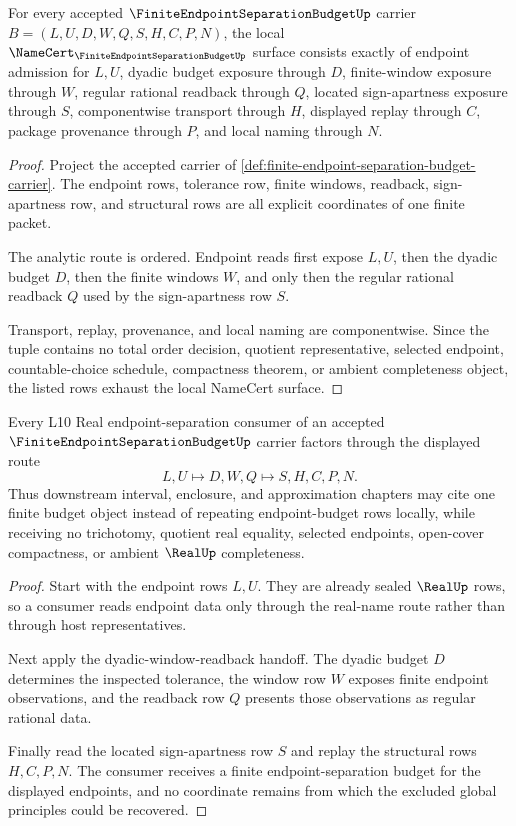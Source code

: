 \begin{theorem}
\label{thm:finite-endpoint-separation-budget-namecert-obligations}
For every accepted $\FiniteEndpointSeparationBudgetUp$ carrier $B=(L,U,D,W,Q,S,H,C,P,N)$, the local $\NameCert_{\FiniteEndpointSeparationBudgetUp}$ surface consists exactly of endpoint admission for $L,U$, dyadic budget exposure through $D$, finite-window exposure through $W$, regular rational readback through $Q$, located sign-apartness exposure through $S$, componentwise transport through $H$, displayed replay through $C$, package provenance through $P$, and local naming through $N$.
\end{theorem}
\begin{proof}
Project the accepted carrier of \autoref{def:finite-endpoint-separation-budget-carrier}. The endpoint rows, tolerance row, finite windows, readback, sign-apartness row, and structural rows are all explicit coordinates of one finite packet.

The analytic route is ordered. Endpoint reads first expose $L,U$, then the dyadic budget $D$, then the finite windows $W$, and only then the regular rational readback $Q$ used by the sign-apartness row $S$.

Transport, replay, provenance, and local naming are componentwise. Since the tuple contains no total order decision, quotient representative, selected endpoint, countable-choice schedule, compactness theorem, or ambient completeness object, the listed rows exhaust the local NameCert surface.
\end{proof}

\begin{theorem}
\label{thm:finite-endpoint-separation-budget-real-route}
Every L10 Real endpoint-separation consumer of an accepted $\FiniteEndpointSeparationBudgetUp$ carrier factors through the displayed route
$$
L,U \longmapsto D,W,Q \longmapsto S,H,C,P,N .
$$
Thus downstream interval, enclosure, and approximation chapters may cite one finite budget object instead of repeating endpoint-budget rows locally, while receiving no trichotomy, quotient real equality, selected endpoints, open-cover compactness, or ambient $\RealUp$ completeness.
\end{theorem}
\begin{proof}
Start with the endpoint rows $L,U$. They are already sealed $\RealUp$ rows, so a consumer reads endpoint data only through the real-name route rather than through host representatives.

Next apply the dyadic-window-readback handoff. The dyadic budget $D$ determines the inspected tolerance, the window row $W$ exposes finite endpoint observations, and the readback row $Q$ presents those observations as regular rational data.

Finally read the located sign-apartness row $S$ and replay the structural rows $H,C,P,N$. The consumer receives a finite endpoint-separation budget for the displayed endpoints, and no coordinate remains from which the excluded global principles could be recovered.
\end{proof}

